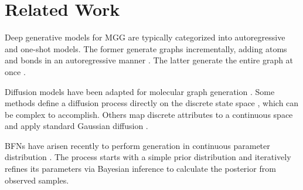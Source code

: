 \documentclass[journal,twoside,web]{ieeecolor}
\begin{document}
\section{Related Work}

Deep generative models for MGG are typically categorized into autoregressive and one-shot models. The former generate graphs incrementally, adding atoms and bonds in an autoregressive manner \cite{you2018graphrnn,jin2018junction,jin2020hierarchical}. 
The latter generate the entire graph at once \cite{simonovsky2018graphvae,luo2021graphdf,martinkus2022spectre}.

Diffusion models have been adapted for molecular graph generation \cite{liu2023generative,li2024regressor}. 
Some methods define a diffusion process directly on the discrete state space \cite{vignac2023digress,xu2024discrete}, which can be complex to accomplish. Others map discrete attributes to a continuous space and apply standard Gaussian diffusion \cite{huang2022graphgdp,lee2023exploring}.

BFNs have arisen recently to perform generation in continuous parameter distribution \cite{graves2023bayesian,song2024unified,qu2024molcraft}. The process starts with a simple prior distribution and iteratively refines its parameters via Bayesian inference to calculate the posterior from observed samples. 
\end{document}
